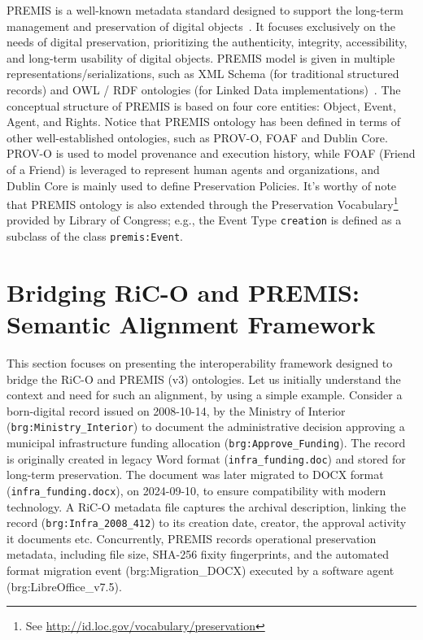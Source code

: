 \documentclass[runningheads]{llncs}
\begin{document}
PREMIS is a well-known metadata standard designed to support the long-term management and preservation of digital objects~\cite{premis_data_dictionary_2015}. It focuses exclusively on the needs of digital preservation, prioritizing the authenticity, integrity, accessibility, and long-term usability of digital objects. PREMIS model is given in multiple representations/serializations, such as XML Schema (for traditional structured records)  and OWL / RDF ontologies (for Linked Data implementations)~\cite{caron2018premis}. The conceptual structure of PREMIS is based on four core entities: Object, Event, Agent, and Rights. 
Notice that PREMIS ontology has been defined in terms of other well-established ontologies, such as PROV-O, FOAF and Dublin Core. PROV-O  is used to model provenance and execution history, while FOAF (Friend of a Friend)  is leveraged to represent human agents and organizations, and Dublin Core is mainly used to define Preservation Policies. It's worthy of note that PREMIS ontology is also extended through the Preservation Vocabulary\footnote{See \url{http://id.loc.gov/vocabulary/preservation}} provided by Library of Congress; e.g., the Event Type \texttt{creation} is defined as a subclass of the class \texttt{premis:Event}.






\section{Bridging RiC-O and PREMIS: Semantic Alignment Framework}
\label{sec:alignment-framework}


This section focuses on presenting the interoperability framework designed to bridge the RiC-O and PREMIS (v3) ontologies. Let us initially understand the context and need for such an alignment, by using a simple example. 
Consider a born-digital record issued on 2008-10-14, by the Ministry of Interior (\texttt{brg:Ministry\_Interior}) to document the administrative decision approving a municipal infrastructure funding allocation (\texttt{brg:Approve\_Funding}). The record is originally created in legacy Word format (\texttt{infra\_funding.doc}) and stored for long-term preservation. The document was later migrated to DOCX format (\texttt{infra\_funding.docx}), on 2024-09-10, to ensure compatibility with modern technology. A RiC-O metadata file captures the archival description, linking the record (\texttt{brg:Infra\_2008\_412}) to its creation date, creator, the approval activity it documents etc. Concurrently, PREMIS records operational preservation metadata, including file size, SHA-256 fixity fingerprints, and the automated format migration event (brg:Migration\_DOCX) executed by a software agent (brg:LibreOffice\_v7.5). 
\end{document}
